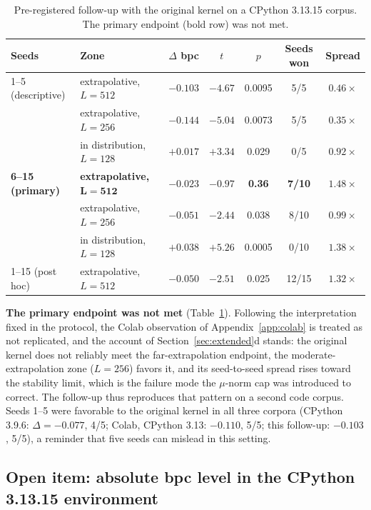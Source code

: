 \documentclass[11pt]{article}
\begin{document}
\begin{table}[h]
\centering\small
\begin{tabular}{llccccc}
\toprule
Seeds & Zone & $\Delta$ bpc & $t$ & $p$ & Seeds won & Spread \\
\midrule
1--5 (descriptive) & extrapolative, $L{=}512$ & $-0.103$ & $-4.67$ & 0.0095 & 5/5 & $0.46\times$ \\
 & extrapolative, $L{=}256$ & $-0.144$ & $-5.04$ & 0.0073 & 5/5 & $0.35\times$ \\
 & in distribution, $L{=}128$ & $+0.017$ & $+3.34$ & 0.029 & 0/5 & $0.92\times$ \\
\midrule
\textbf{6--15 (primary)} & \textbf{extrapolative, $\boldsymbol{L{=}512}$} & $\mathbf{-0.023}$ & $\mathbf{-0.97}$ & \textbf{0.36} & \textbf{7/10} & $\mathbf{1.48\times}$ \\
 & extrapolative, $L{=}256$ & $-0.051$ & $-2.44$ & 0.038 & 8/10 & $0.99\times$ \\
 & in distribution, $L{=}128$ & $+0.038$ & $+5.26$ & 0.0005 & 0/10 & $1.38\times$ \\
\midrule
1--15 (post hoc) & extrapolative, $L{=}512$ & $-0.050$ & $-2.51$ & 0.025 & 12/15 & $1.32\times$ \\
\bottomrule
\end{tabular}
\caption{Pre-registered follow-up with the original kernel on a CPython 3.13.15 corpus. The primary endpoint (bold row) was not met.}
\label{tab:app-followup}
\end{table}

\textbf{The primary endpoint was not met} (Table~\ref{tab:app-followup}). Following the interpretation fixed in the protocol, the Colab observation of Appendix~\ref{app:colab} is treated as not replicated, and the account of Section~\ref{sec:extended}d stands: the original kernel does not reliably meet the far-extrapolation endpoint, the moderate-extrapolation zone ($L{=}256$) favors it, and its seed-to-seed spread rises toward the stability limit, which is the failure mode the $\mu$-norm cap was introduced to correct. The follow-up thus reproduces that pattern on a second code corpus. Seeds 1--5 were favorable to the original kernel in all three corpora (CPython 3.9.6: $\Delta = -0.077$, 4/5; Colab, CPython 3.13: $-0.110$, 5/5; this follow-up: $-0.103$, 5/5), a reminder that five seeds can mislead in this setting.

\subsection{Open item: absolute bpc level in the CPython 3.13.15 environment}\label{app:open}
\end{document}
